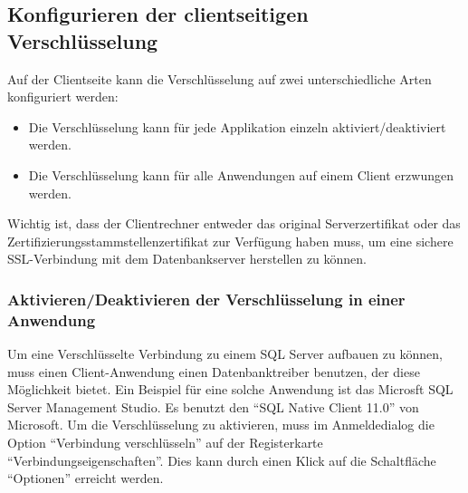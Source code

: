       \subsection{Konfigurieren der clientseitigen Verschlüsselung}
        Auf der Clientseite kann die Verschlüsselung auf zwei unterschiedliche
        Arten konfiguriert werden:
        \begin{itemize}
          \item Die Verschlüsselung kann für jede Applikation einzeln
          aktiviert/deaktiviert werden.
          \item Die Verschlüsselung kann für alle Anwendungen auf einem Client
          erzwungen werden.
        \end{itemize}
        Wichtig ist, dass der Clientrechner entweder das original
        Serverzertifikat oder das Zertifizierungsstammstellenzertifikat zur
        Verfügung haben muss, um eine sichere SSL-Verbindung mit dem
        Datenbankserver herstellen zu können.
        \subsubsection{Aktivieren/Deaktivieren der Verschlüsselung in einer Anwendung}
          Um eine Verschlüsselte Verbindung zu einem SQL Server aufbauen zu
          können, muss einen Client-Anwendung einen Datenbanktreiber benutzen,
          der diese Möglichkeit bietet. Ein Beispiel für eine solche Anwendung
          ist das Microsft SQL Server Management Studio. Es benutzt den
          \enquote{SQL Native Client 11.0} von Microsoft. Um die Verschlüsselung
          zu aktivieren, muss im Anmeldedialog die Option \enquote{Verbindung
          verschlüsseln} auf der Registerkarte
          \enquote{Verbindungseigenschaften}. Dies kann durch einen Klick auf
          die Schaltfläche \enquote{Optionen} erreicht werden.
